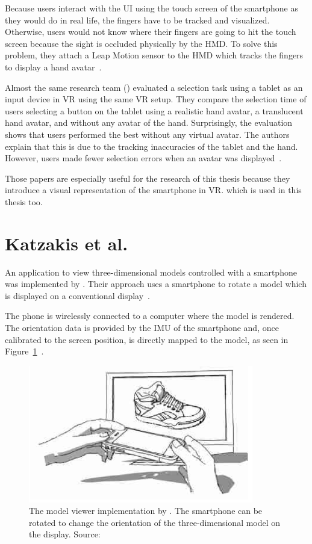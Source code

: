 Because users interact with the \gls{UI} using the touch screen of the smartphone as they would do in real life, the fingers have to be tracked and visualized. Otherwise, users would not know where their fingers are going to hit the touch screen because the sight is occluded physically by the \gls{HMD}. To solve this problem, they attach a Leap Motion sensor to the \gls{HMD} which tracks the fingers to display a hand avatar~\cite{Dias.2018}.

Almost the same research team (\citeauthor{Afonso.2017}) evaluated a selection task using a tablet as an input device in \gls{VR} using the same \gls{VR} setup. They compare the selection time of users selecting a button on the tablet using a realistic hand avatar, a translucent hand avatar, and without any avatar of the hand. Surprisingly, the evaluation shows that users performed the best without any virtual avatar. The authors explain that this is due to the tracking inaccuracies of the tablet and the hand. However, users made fewer selection errors when an avatar was displayed~\cite[247-248]{Afonso.2017}.

Those papers are especially useful for the research of this thesis because they introduce a visual representation of the smartphone in \gls{VR}. which is used in this thesis too. 


\section{Katzakis et al.}\label{section:katzakis-2010}
An application to view three-dimensional models controlled with a smartphone was implemented by \citeauthor{Katzakis.2010}. Their approach uses a smartphone to rotate a model which is displayed on a conventional display~\cite[139]{Katzakis.2010}. 

The phone is wirelessly connected to a computer where the model is rendered. The orientation data is provided by the \gls{IMU} of the smartphone and, once calibrated to the screen position, is directly mapped to the model, as seen in Figure~\ref{fig:katzakis-2010}~\cite[139]{Katzakis.2010}. 

\begin{figure}[H]%
  \centering%
  \includegraphics[height=6cm]{figures/related_work/katzakis_2010_3d_object.png}%
  \caption[Model viewer implementation by Katzakis et al.]{
  The model viewer implementation by \citeauthor{Katzakis.2010}. The smartphone can be rotated to change the orientation of the three-dimensional model on the display.
  \newline{}
  Source:~\cite[Figure 1]{Katzakis.2010}}\label{fig:katzakis-2010}
\end{figure}

